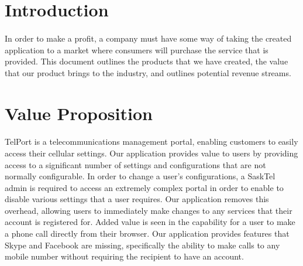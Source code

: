 \documentclass[12pt]{article}
\begin{document}
\pagestyle{plain} %

\tableofcontents %
\cleardoublepage %

\pagestyle{plain} %



\doublespacing
\section{Introduction}
\paragraph{}
	In order to make a profit, a company must have some way of taking the created application to a market where consumers will purchase the service that is provided. This document outlines the products that we have created, the value that our product brings to the industry, and outlines potential revenue streams.

\section{Value Proposition}
\paragraph{}
TelPort is a telecommunications management portal, enabling customers to easily access their cellular settings. Our application provides value to users by providing access to a significant number of settings and configurations that are not normally configurable. In order to change a user’s configurations, a SaskTel admin is required to access an extremely complex portal in order to enable to disable various settings that a user requires. Our application removes this overhead, allowing users to immediately make changes to any services that their account is registered for. Added value is seen in the capability for a user to make a phone call directly from their browser. Our application provides features that Skype and Facebook are missing, specifically the ability to make calls to any mobile number without requiring the recipient to have an account. 
\end{document}
